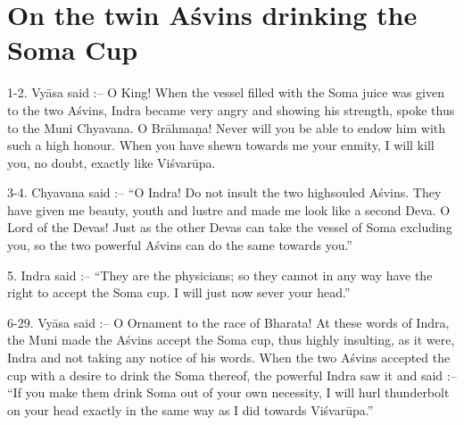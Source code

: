 \chapter{On the twin A\'svins drinking the Soma Cup}

1-2. Vy\=asa said :-- O King! When the vessel filled with the Soma juice was given to the two A\'svins, Indra became very angry and showing his strength, spoke thus to the Muni Chyavana. O Br\=ahma\d{n}a! Never will you be able to endow him with such a high honour. When you have shewn towards me your enmity, I will kill you, no doubt, exactly like Vi\'svar\=upa.

3-4. Chyavana said :-- ``O Indra! Do not insult the two highsouled A\'svins. They have given me beauty, youth and lustre and made me look like a second Deva. O Lord of the Devas! Just as the other Devas can take the vessel of Soma excluding you, so the two powerful A\'svins can do the same towards you.''

5. Indra said :-- ``They are the physicians; so they cannot in any way have the right to accept the Soma cup. I will just now sever your head.''

6-29. Vy\=asa said :-- O Ornament to the race of Bharata! At these words of Indra, the Muni made the A\'svins accept the Soma cup, thus highly insulting, as it were, Indra and not taking any notice of his words. When the two A\'svins accepted the cup with a desire to drink the Soma thereof, the powerful Indra saw it and said :-- ``If you make them drink Soma out of your own necessity, I will hurl thunderbolt on your head exactly in the same way as I did towards Vi\'svar\=upa.''

